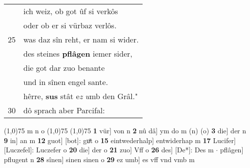 \documentclass[8pt,a4paper,notitlepage]{article}
\begin{document}
\begin{table}[ht]
\begin{minipage}[t]{0.5\linewidth}
\begin{tabular}{rl}
 & ich weiz, ob got ûf si verkôs\\ 
 & oder ob er si vürbaz verlôs.\\ 
25 & was daz sîn reht, er nam si wider.\\ 
 & des steines \textbf{pflâgen} iemer sider,\\ 
 & die got dar zuo benante\\ 
 & und in sînen engel sante.\\ 
 & hêrre, \textbf{sus} stât e\textit{z} \textit{u}mb den Grâl."\\ 
30 & dô sprach aber Parcifal:\\ 
\end{tabular}
\scriptsize
\line(1,0){75} \newline
m n o \newline
\line(1,0){75} \newline
\newline
\line(1,0){75} \newline
\textbf{1} vür] von n \textbf{2} nû dâ] ym do m (n) (o) \textbf{3} die] der n \textbf{9} in] an m \textbf{12} guot] [bot]: guͦt o \textbf{15} eintwederhalp] entwiderhap m \textbf{17} Lucifer] [Luczefel]: Luczefer o \textbf{20} die] der o \textbf{21} zuo] Vff o \textbf{26} des] [De*]: Des m  $\cdot$ pflâgen] pflugent n \textbf{28} sînen] sinen sinen o \textbf{29} ez umb] es vff vnd vmb m \newline
\end{minipage}
\end{table}
\newpage
\end{document}
